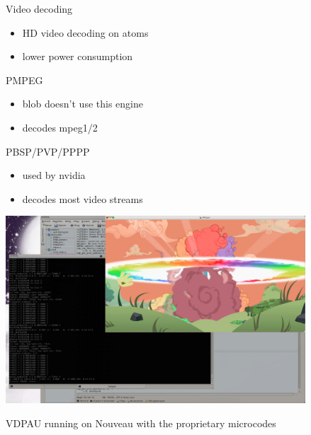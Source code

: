 \documentclass[11pt,english,compress]{beamer}
\begin{document}
		\begin{frame}
			\begin{block}{Video decoding}
				\begin{itemize}
					\item HD video decoding on atoms
					\item lower power consumption
				\end{itemize}
			\end{block}

			\begin{block}{PMPEG}
				\begin{itemize}
					\item blob doesn't use this engine
					\item decodes mpeg1/2
				\end{itemize}
			\end{block}

			\begin{block}{PBSP/PVP/PPPP}
				\begin{itemize}
					\item used by nvidia
					\item decodes most video streams
				\end{itemize}
			\end{block}
		\end{frame}

		\begin{frame}
			\begin{center}
				\includegraphics[height=7cm]{imgs/h264_vp_decoded2.png}
			\end{center}
			\begin{center}
				VDPAU running on Nouveau with the proprietary microcodes
			\end{center}
		\end{frame}
\end{document}
